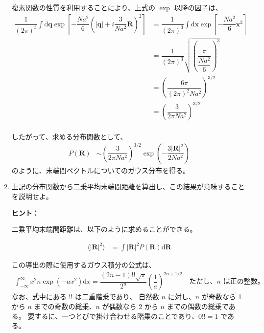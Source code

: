 \documentclass[uplatex,dvipdfmx,a4paper,11pt]{jsarticle}
\newcommand{\diff}{\mathrm d}
\begin{document}
\begin{enumerate}
複素関数の性質を利用することにより、上式の $\exp$ 以降の因子は、
\begin{align*}
\dfrac{1}{(2 \pi)^3} \int \diff \bm{q} \exp \left[ - \dfrac{Na^2}{6} \left( |\bm{q}| + i \dfrac{3}{Na^2} \bm{R} \right)^2 \right] 
	&= \dfrac{1}{(2 \pi)^3} \int \diff \bm{x} \exp \left[ - \dfrac{Na^2}{6} \bm{x}^2 \right] \\
	&= \dfrac{1}{(2 \pi)^3} \sqrt{\left( \dfrac{\pi}{\dfrac{N a^2}{6}} \right)^{3} }\\
	&= \left( \dfrac{6 \pi}{(2 \pi)^2 N a^2} \right)^{3/2} \\
	&= \left( \dfrac{3}{2 \pi N a^2} \right)^{3/2} \\
\end{align*}

したがって、求める分布関数として、
\begin{align*}
P(\bm{R}) 
	&\sim \left( \dfrac{3}{2 \pi N a^2} \right)^{3/2} \exp \left( -\dfrac{3|\bm{R}|^2}{2Na^2} \right)
\end{align*}
のように、末端間ベクトルについてのガウス分布を得る。

\newpage

\item
上記の分布関数から二乗平均末端間距離を算出し、この結果が意味することを説明せよ。

\vspace{10pt}

\begin{itembox}[l]{{\bf ヒント：}}

二乗平均末端間距離は、以下のように求めることができる。

\begin{align*}
\langle |\bm{R}|^2 \rangle 
	&= \int |\bm{R}|^2 P(\bm{R}) \diff \bm{R} 
\end{align*}

この導出の際に使用するガウス積分の公式は、
\begin{align*}
\int_{-\infty}^{\infty} x^2n \exp(-ax^2) \diff x = \dfrac{(2n-1)!! \sqrt{\pi}}{2^n} \left( \dfrac{1}{a} \right)^{{2n+1}/{2}}\quad \text{ただし、$n$ は正の整数。}
\end{align*}
なお、式中にある $!!$ は二重階乗であり、 自然数 $n$ に対し、$n$ が奇数なら 1 から $n$ までの奇数の総乗、$n$ が偶数なら 2 から $n$ までの偶数の総乗である。
要するに、一つとびで掛け合わせる階乗のことであり、$0!! = 1$ である。

\color{black}
\end{itembox}

\vspace{10pt}


\end{enumerate}
\end{document}
